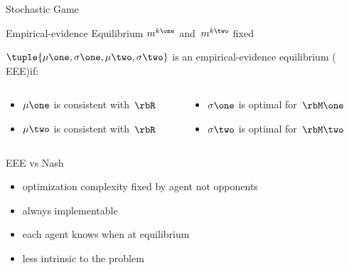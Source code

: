 \begin{frame}{Stochastic Game}
\end{frame}
\begin{frame}{Empirical-evidence Equilibrium}
\(m^{k\one}\) and~\(m^{k\two}\) fixed

\bigskip


\bigskip

\(\tuple{\mu\one, \sigma\one, \mu\two, \sigma\two}\) is an \Alt<2>{\alert{\(\epsilon\)}}{} empirical-evidence equilibrium ( EEE)if:
\begin{columns}
\begin{column}{0.4\textwidth}
\begin{itemize}
\item \(\mu\one\) is consistent with~\(\rbR\)
\item \(\mu\two\) is consistent with~\(\rbR\)
\end{itemize}
\end{column}
\begin{column}{0.4\textwidth}
\begin{itemize}
\item \(\sigma\one\) is  optimal for~\(\rbM\one\)
\item \(\sigma\two\) is  optimal for~\(\rbM\two\)
\end{itemize}
\end{column}
\end{columns}
\end{frame}
\begin{frame}{EEE vs Nash}
\begin{itemize}
\item optimization complexity fixed by agent not opponents
\item always implementable
\item each agent knows when at equilibrium
\item less intrinsic to the problem
\end{itemize}
\end{frame}
